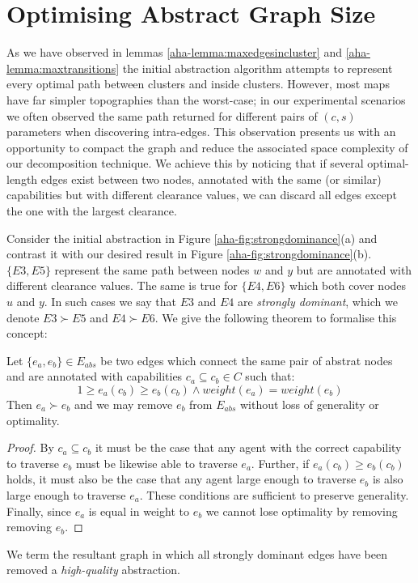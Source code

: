 \section{Optimising Abstract Graph Size}
\par \indent
As we have observed in lemmas \ref{aha-lemma:maxedgesincluster} and \ref{aha-lemma:maxtransitions} the initial abstraction algorithm attempts to represent every optimal path between clusters and inside clusters.
However, most maps have far simpler topographies than the worst-case; in our  experimental scenarios we often observed the same path returned for different pairs of $(c, s)$ parameters when discovering intra-edges.
This observation presents us with an opportunity to compact the graph and reduce the associated space complexity of our decomposition technique. 
We achieve this by noticing that if several optimal-length edges exist between two nodes, annotated with the same (or similar) capabilities but with different clearance values, we can discard all edges except the one with the largest clearance. 
\par \indent
Consider the initial abstraction in Figure \ref{aha-fig:strongdominance}(a) and contrast it with our desired result in Figure \ref{aha-fig:strongdominance}(b). $\lbrace E3, E5 \rbrace$ represent the same path between nodes $w$ and $y$ but are annotated with different clearance values. 
The same is true  for $\lbrace E4, E6 \rbrace$ which both cover nodes $u$ and $y$. In such cases we say that $E3$ and $E4$ are \emph{strongly dominant}, which we denote $E3 \succ E5$ and $E4 \succ E6$. We give the following theorem to formalise this concept:

\begin{theorem}
\label{aha-definition:strongdominance}
Let $\lbrace e_{a}, e_{b} \rbrace \in E_{abs}$ be two edges which connect the same pair of abstrat nodes and are annotated with capabilities $c_{a} \subseteq c_{b} \in C$ such that: 
$$ 1 \geq e_{a}(c_{b}) \geq e_{b}(c_{b}) \wedge weight(e_{a}) = weight(e_{b})$$
Then $e_{a} \succ e_{b}$ and we may remove $e_{b}$ from $E_{abs}$ without loss of generality or optimality.
\end{theorem}
\begin{proof}
By $c_{a} \subseteq c_{b}$ it must be the case that any agent with the correct capability to traverse $e_{b}$ must be likewise able to traverse $e_{a}$.
Further, if $e_{a}(c_{b}) \geq e_{b}(c_{b})$ holds, it must also be the case that any agent large enough to traverse $e_{b}$ is also large enough to traverse $e_{a}$.
These conditions are sufficient to preserve generality.
Finally, since $e_{a}$ is equal in weight to $e_{b}$ we cannot lose optimality by removing removing $e_{b}$.
\end{proof}
We term the resultant graph in which all strongly dominant edges have been removed a \emph{high-quality} abstraction.  

